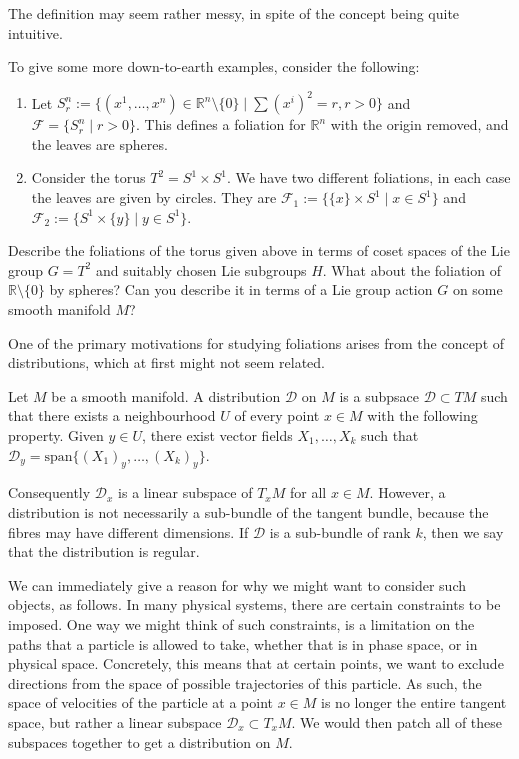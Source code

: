 The definition may seem rather messy, in spite of the concept being quite intuitive.
\begin{example}
  To give some more down-to-earth examples, consider the following:
  \begin{enumerate}\label{foliations}
    \item Let $S^n_r:=\{(x^1,\dots,x^n)\in\mathbb{R}^n\setminus \{0\}\mid \sum (x^i)^2=r, r>0\}$ and $\mathcal{F}=\{S^n_r\mid r>0\}$. This defines a foliation for $\mathbb{R}^n$ with the origin removed, and the leaves are spheres.
    \item Consider the torus $T^2=S^1\times S^1$. We have two different foliations, in each case the leaves are given by circles. They are $\mathcal{F}_1:=\{\{x\}\times S^1\mid x\in S^1\}$ and $\mathcal{F}_2:=\{S^1\times\{y\}\mid y\in S^1\}$.
  \end{enumerate}
\end{example}
\begin{exercise}
  Describe the foliations of the torus given above in terms of coset spaces of the Lie group $G=T^2$ and suitably chosen Lie subgroups $H$. What about the foliation of $\mathbb{R}\setminus\{0\}$ by spheres? Can you describe it in terms of a Lie group action $G$ on some smooth manifold $M$?
\end{exercise}
One of the primary motivations for studying foliations arises from the concept of distributions, which at first might not seem related.
\begin{definition}
  Let $M$ be a smooth manifold. A distribution $\mathcal{D}$ on $M$ is a subpsace $\mathcal{D}\subset TM$ such that there exists a neighbourhood $U$ of every point $x\in M$ with the following property. Given $y\in U$, there exist vector fields $X_1,\dots,X_k$ such that $\mathcal{D}_y=\text{span}\{(X_1)_y,\dots,(X_k)_y\}$.
\end{definition}
Consequently $\mathcal{D}_x$ is a linear subspace of $T_xM$ for all $x\in M$. However, a distribution is not necessarily a sub-bundle of the tangent bundle, because the fibres may have different dimensions. If $\mathcal{D}$ is a sub-bundle of rank $k$, then we say that the distribution is regular. \par
We can immediately give a reason for why we might want to consider such objects, as follows. In many physical systems, there are certain constraints to be imposed. One way we might think of such constraints, is a limitation on the paths that a particle is allowed to take, whether that is in phase space, or in physical space. Concretely, this means that at certain points, we want to exclude directions from the space of possible trajectories of this particle. As such, the space of velocities of the particle at a point $x\in M$ is no longer the entire tangent space, but rather a linear subspace $\mathcal{D}_x\subset T_xM$. We would then patch all of these subspaces together to get a distribution on $M$.
